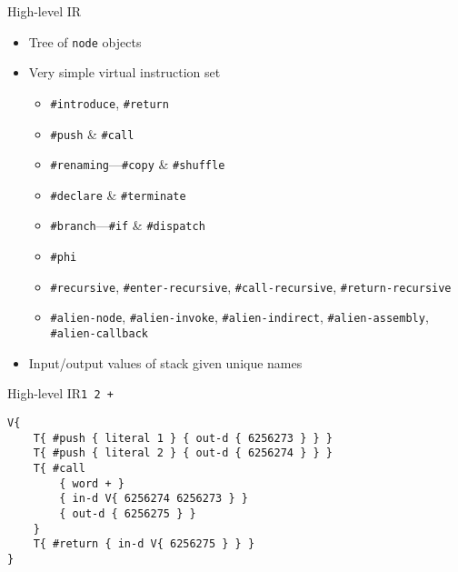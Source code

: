 \documentclass{beamer}
\begin{document}
\begin{frame}{High-level IR}
  \begin{itemize}
    \item Tree of \texttt{node} objects
    \item Very simple virtual instruction set
    \begin{itemize}
      \item \texttt{\#introduce}, \texttt{\#return}
      \item \texttt{\#push} \& \texttt{\#call}
      \item \texttt{\#renaming}---\texttt{\#copy} \& \texttt{\#shuffle}
      \item \texttt{\#declare} \& \texttt{\#terminate}
      \item \texttt{\#branch}---\texttt{\#if} \& \texttt{\#dispatch}
      \item \texttt{\#phi}
      \item \texttt{\#recursive}, \texttt{\#enter-recursive},
            \texttt{\#call-recursive}, \texttt{\#return-recursive}
      \item \texttt{\#alien-node}, \texttt{\#alien-invoke},
            \texttt{\#alien-indirect}, \texttt{\#alien-assembly},
            \texttt{\#alien-callback}
    \end{itemize}
    \item Input/output values of stack given unique names
  \end{itemize}
\end{frame}

\begin{frame}[fragile]{High-level IR}{\texttt{1~2~+}}
  \begin{example}
    \begin{verbatim}
V{
    T{ #push { literal 1 } { out-d { 6256273 } } }
    T{ #push { literal 2 } { out-d { 6256274 } } }
    T{ #call
        { word + }
        { in-d V{ 6256274 6256273 } }
        { out-d { 6256275 } }
    }
    T{ #return { in-d V{ 6256275 } } }
}
    \end{verbatim}
  \end{example}
\end{frame}
\end{document}
